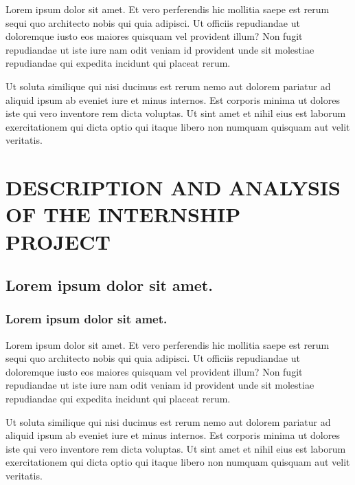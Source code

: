 \documentclass[12pt]{article}
\begin{document}
\noindent Lorem ipsum dolor sit amet. Et vero perferendis hic mollitia saepe est rerum sequi quo architecto nobis qui quia adipisci. Ut officiis repudiandae ut doloremque iusto eos maiores quisquam vel provident illum? Non fugit repudiandae ut iste iure nam odit veniam id provident unde sit molestiae repudiandae qui expedita incidunt qui placeat rerum.

Ut soluta similique qui nisi ducimus est rerum nemo aut dolorem pariatur ad aliquid ipsum ab eveniet iure et minus internos. Est corporis minima ut dolores iste qui vero inventore rem dicta voluptas. Ut sint amet et nihil eius est laborum exercitationem qui dicta optio qui itaque libero non numquam quisquam aut velit veritatis.

\newpage
\section{DESCRIPTION AND ANALYSIS OF THE INTERNSHIP PROJECT}

\subsection{Lorem ipsum dolor sit amet.}
\subsubsection{Lorem ipsum dolor sit amet.}

Lorem ipsum dolor sit amet. Et vero perferendis hic mollitia saepe est rerum sequi quo architecto nobis qui quia adipisci. Ut officiis repudiandae ut doloremque iusto eos maiores quisquam vel provident illum? Non fugit repudiandae ut iste iure nam odit veniam id provident unde sit molestiae repudiandae qui expedita incidunt qui placeat rerum.

Ut soluta similique qui nisi ducimus est rerum nemo aut dolorem pariatur ad aliquid ipsum ab eveniet iure et minus internos. Est corporis minima ut dolores iste qui vero inventore rem dicta voluptas. Ut sint amet et nihil eius est laborum exercitationem qui dicta optio qui itaque libero non numquam quisquam aut velit veritatis.\\

\newpage
\end{document}
